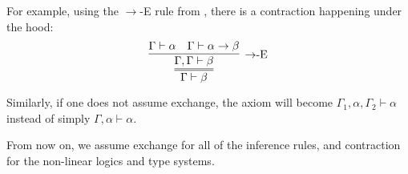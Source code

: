For example, using the $\rightarrow$-E rule from , there is a contraction happening under the hood:
\[
\infer={\Gamma \vdash \beta}{
    \infer[\mbox{$\rightarrow$-E}]{\Gamma, \Gamma \vdash \beta}{
        \Gamma \vdash \alpha
        &
        \Gamma \vdash \alpha \rightarrow \beta
    }
}
\]

Similarly, if one does not assume exchange, the axiom will become $\Gamma_1, \alpha, \Gamma_2 \vdash \alpha$ instead of simply $\Gamma, \alpha \vdash \alpha$.

From now on, we assume exchange for all of the inference rules, and contraction for the non-linear logics and type systems.